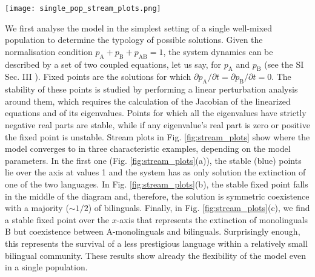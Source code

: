 \documentclass[../thesis.tex]{subfiles}
\begin{document}
\begin{figure*}
    \centering
    \texttt{[image: single\_pop\_stream\_plots.png]}
    \caption{Flow diagrams for the dynamics of two languages according to our model
    described in equation \eqref{eq:bipref_model} set in a well-mixed population.
    $p_{\text{A}}$ and $p_{\text{B}}$ denote the proportions of monolinguals in A and B,
    respectively, and the proportion of bilinguals $p_{\text{AB}}$ is such that
    $p_{\text{A}} + p_{\text{B}} + p_{\text{AB}} = 1$. The mortality rate is fixed at
    $\mu = 0.02$. (a) For $s = q = 1/2$ and $c=0.02$, the stable outcome is
    extinction of one of the two languages. (b) For $s = q = 1/2$ and $c =
    0.05$, the higher learning rate leads to a solution featuring stable coexistence.
    (c) For $s = 0.57$, $q = 0.45$ and $c = 0.05$, despite the lower prestige,
    B survives in a small community of bilinguals as it is the preferred language among
    them.}
    \label{fig:stream_plots}
\end{figure*}

We first analyse the model in the simplest setting of a single well-mixed population to
determine the typology of possible solutions. Given the normalisation condition
$p_\text{A}+p_\text{B}+p_\text{AB} = 1$, the system dynamics can be described by a set
of two coupled equations, let us say, for $p_\text{A}$ and $p_\text{B}$ (see the SI Sec.
III \cite{supp}). Fixed points are the solutions for which $\partial p_\text{A}/\partial
t = \partial p_\text{B}/\partial t = 0$. The stability of these points is studied by
performing a linear perturbation analysis around them, which requires the calculation of
the Jacobian of the linearized equations and of its eigenvalues. Points for which all
the eigenvalues have strictly negative real parts are stable, while if any eigenvalue's
real part is zero or positive the fixed point is unstable. Stream plots in Fig.
\cref{fig:stream_plots} show where the model converges to in three characteristic
examples, depending on the model parameters. In the first one (Fig.
\cref{fig:stream_plots}(a)), the stable (blue) points lie over the axis at values
1 and the system has as only solution the extinction of one of the two languages. In
Fig. \cref{fig:stream_plots}(b), the stable fixed point falls in the middle of the
diagram and, therefore, the solution is symmetric coexistence with a majority ($\sim
1/2$) of bilinguals. Finally, in Fig. \cref{fig:stream_plots}(c), we find a stable
fixed point over the $x$-axis that represents the extinction of monolinguals B but
coexistence between A-monolinguals and bilinguals. Surprisingly enough, this represents
the survival of a less prestigious language within a relatively small bilingual
community. These results show already the flexibility of the model even in a single
population.
\end{document}
